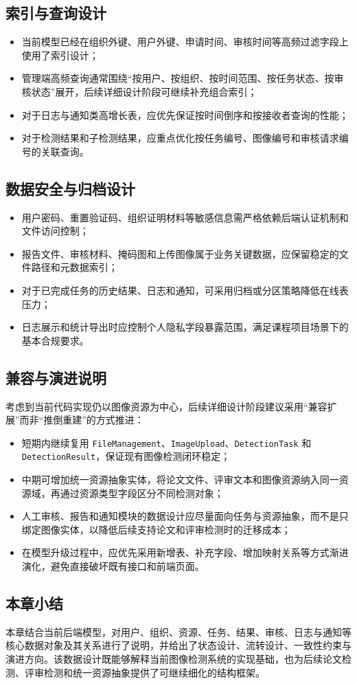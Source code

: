 \subsection{索引与查询设计}
\begin{itemize}[leftmargin=2em]
    \item 当前模型已经在组织外键、用户外键、申请时间、审核时间等高频过滤字段上使用了索引设计；
    \item 管理端高频查询通常围绕“按用户、按组织、按时间范围、按任务状态、按审核状态”展开，后续详细设计阶段可继续补充组合索引；
    \item 对于日志与通知类高增长表，应优先保证按时间倒序和按接收者查询的性能；
    \item 对于检测结果和子检测结果，应重点优化按任务编号、图像编号和审核请求编号的关联查询。
\end{itemize}

\subsection{数据安全与归档设计}
\begin{itemize}[leftmargin=2em]
    \item 用户密码、重置验证码、组织证明材料等敏感信息需严格依赖后端认证机制和文件访问控制；
    \item 报告文件、审核材料、掩码图和上传图像属于业务关键数据，应保留稳定的文件路径和元数据索引；
    \item 对于已完成任务的历史结果、日志和通知，可采用归档或分区策略降低在线表压力；
    \item 日志展示和统计导出时应控制个人隐私字段暴露范围，满足课程项目场景下的基本合规要求。
\end{itemize}

\subsection{兼容与演进说明}
考虑到当前代码实现仍以图像资源为中心，后续详细设计阶段建议采用“兼容扩展”而非“推倒重建”的方式推进：
\begin{itemize}[leftmargin=2em]
    \item 短期内继续复用 \texttt{FileManagement}、\texttt{ImageUpload}、\texttt{DetectionTask} 和 \texttt{DetectionResult}，保证现有图像检测闭环稳定；
    \item 中期可增加统一资源抽象实体，将论文文件、评审文本和图像资源纳入同一资源域，再通过资源类型字段区分不同检测对象；
    \item 人工审核、报告和通知模块的数据设计应尽量面向任务与资源抽象，而不是只绑定图像实体，以降低后续支持论文和评审检测时的迁移成本；
    \item 在模型升级过程中，应优先采用新增表、补充字段、增加映射关系等方式渐进演化，避免直接破坏既有接口和前端页面。
\end{itemize}

\subsection{本章小结}
本章结合当前后端模型，对用户、组织、资源、任务、结果、审核、日志与通知等核心数据对象及其关系进行了说明，并给出了状态设计、流转设计、一致性约束与演进方向。该数据设计既能够解释当前图像检测系统的实现基础，也为后续论文检测、评审检测和统一资源抽象提供了可继续细化的结构框架。
